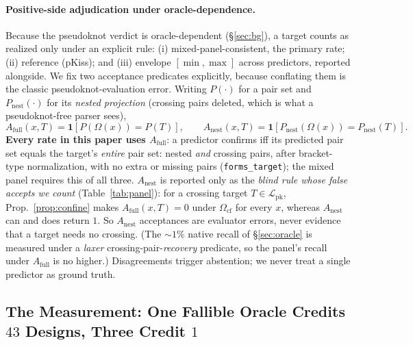 \documentclass[11pt]{article}
\newcommand{\PK}{\ensuremath{\mathcal{L}_{\mathrm{pk}}}}
\newcommand{\Ocf}{\ensuremath{\Omega_{\mathrm{cf}}}}
\begin{document}
\paragraph{Positive-side adjudication under oracle-dependence.} Because the pseudoknot verdict is
oracle-dependent (\S\ref{sec:bg}), a target counts as realized only under an explicit rule: (i)
mixed-panel-consistent, the primary rate; (ii) reference (pKiss); and (iii) envelope $[\min,\max]$ across
predictors, reported alongside. We fix two acceptance predicates explicitly, because conflating them is the
classic pseudoknot-evaluation error. Writing $P(\cdot)$ for a pair set and $P_{\mathrm{nest}}(\cdot)$ for its
\emph{nested projection} (crossing pairs deleted, which is what a pseudoknot-free parser sees),
\begin{equation}\label{eq:predicates}
  A_{\mathrm{full}}(x,T)=\mathbf 1\!\left[P(\Omega(x))=P(T)\right],
  \qquad
  A_{\mathrm{nest}}(x,T)=\mathbf 1\!\left[P_{\mathrm{nest}}(\Omega(x))=P_{\mathrm{nest}}(T)\right].
\end{equation}
\textbf{Every rate in this paper uses $A_{\mathrm{full}}$}: a predictor confirms iff its predicted pair set
equals the target's \emph{entire} pair set: nested \emph{and} crossing pairs, after bracket-type
normalization, with no extra or missing pairs (\texttt{forms\_target}); the mixed panel requires this of all
three. $A_{\mathrm{nest}}$ is reported only as the \emph{blind rule whose false accepts we count}
(Table~\ref{tab:panel}): for a crossing target $T\in\PK$, Prop.~\ref{prop:confine} makes
$A_{\mathrm{full}}(x,T)=0$ under \Ocf{} for every $x$, whereas $A_{\mathrm{nest}}$ can and does return $1$. So
$A_{\mathrm{nest}}$ acceptances are evaluator errors, never evidence that a target needs no crossing.
(The $\sim\!1\%$ native recall of \S\ref{sec:oracle} is measured under a \emph{laxer}
crossing-pair-\emph{recovery} predicate, so the panel's recall under $A_{\mathrm{full}}$ is no
higher.) Disagreements trigger abstention; we never treat a single predictor as ground truth.


%



\subsection{The Measurement: One Fallible Oracle Credits $43$ Designs, Three Credit $1$}\label{sec:exp:gaming}
\end{document}
